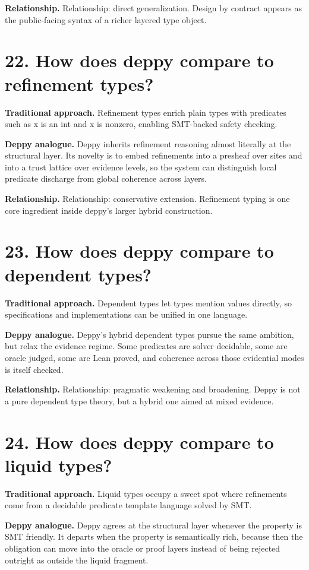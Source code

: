\documentclass[11pt,openany]{book}
\begin{document}
\textbf{Relationship.} Relationship: direct generalization. Design by contract appears as the public-facing syntax of a richer layered type object.

\section*{22. How does deppy compare to refinement types?}
\textbf{Traditional approach.} Refinement types enrich plain types with predicates such as x is an int and x is nonzero, enabling SMT-backed safety checking.

\textbf{Deppy analogue.} Deppy inherits refinement reasoning almost literally at the structural layer. Its novelty is to embed refinements into a presheaf over sites and into a trust lattice over evidence levels, so the system can distinguish local predicate discharge from global coherence across layers.

\textbf{Relationship.} Relationship: conservative extension. Refinement typing is one core ingredient inside deppy's larger hybrid construction.

\section*{23. How does deppy compare to dependent types?}
\textbf{Traditional approach.} Dependent types let types mention values directly, so specifications and implementations can be unified in one language.

\textbf{Deppy analogue.} Deppy's hybrid dependent types pursue the same ambition, but relax the evidence regime. Some predicates are solver decidable, some are oracle judged, some are Lean proved, and coherence across those evidential modes is itself checked.

\textbf{Relationship.} Relationship: pragmatic weakening and broadening. Deppy is not a pure dependent type theory, but a hybrid one aimed at mixed evidence.

\section*{24. How does deppy compare to liquid types?}
\textbf{Traditional approach.} Liquid types occupy a sweet spot where refinements come from a decidable predicate template language solved by SMT.

\textbf{Deppy analogue.} Deppy agrees at the structural layer whenever the property is SMT friendly. It departs when the property is semantically rich, because then the obligation can move into the oracle or proof layers instead of being rejected outright as outside the liquid fragment.
\end{document}
